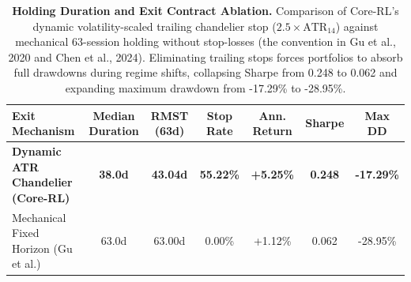 \begin{table}[ht]
\centering
\small
\begin{tabular}{lcccccc}
\toprule
\textbf{Exit Mechanism} & \textbf{Median Duration} & \textbf{RMST (63d)} & \textbf{Stop Rate} & \textbf{Ann. Return} & \textbf{Sharpe} & \textbf{Max DD} \\
\midrule
\textbf{Dynamic ATR Chandelier (Core-RL)} & \textbf{38.0d} & \textbf{43.04d} & \textbf{55.22\%} & \textbf{+5.25\%} & \textbf{0.248} & \textbf{-17.29\%} \\
Mechanical Fixed Horizon (Gu et al.) & 63.0d & 63.00d & 0.00\% & +1.12\% & 0.062 & -28.95\% \\
\bottomrule
\end{tabular}
\caption{\textbf{Holding Duration and Exit Contract Ablation.} Comparison of Core-RL's dynamic volatility-scaled trailing chandelier stop ($2.5\times\text{ATR}_{14}$) against mechanical 63-session holding without stop-losses (the convention in Gu et al., 2020 and Chen et al., 2024). Eliminating trailing stops forces portfolios to absorb full drawdowns during regime shifts, collapsing Sharpe from 0.248 to 0.062 and expanding maximum drawdown from -17.29\% to -28.95\%.}
\label{tab:ablation_exit_contract}
\end{table}
